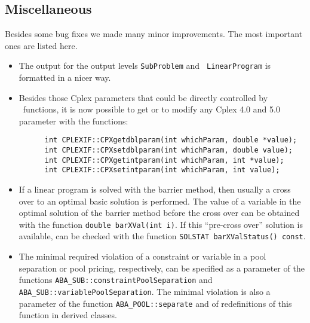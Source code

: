 \subsection{Miscellaneous}

Besides some bug fixes we made many minor improvements. The most important
ones are listed here.

\begin{itemize}
\item The output for the output levels {\tt SubProblem} and {\tt
 LinearProgram} is formatted in a nicer way.
\item Besides those Cplex parameters that could be directly controlled
      by \ABACUS\ functions, it is now possible to get or to modify
      any Cplex 4.0 and 5.0 parameter with the functions:
      \begin{verbatim}
      int CPLEXIF::CPXgetdblparam(int whichParam, double *value);
      int CPLEXIF::CPXsetdblparam(int whichParam, double value);
      int CPLEXIF::CPXgetintparam(int whichParam, int *value);
      int CPLEXIF::CPXsetintparam(int whichParam, int value);
      \end{verbatim}
\item If a linear program is solved with the barrier method, then
      usually a cross over to an optimal basic solution is
      performed. The value of a variable in the
      optimal solution of the barrier method before 
      the cross over can be obtained with the function
      {\tt double barXVal(int i)}. If this ``pre-cross over'' solution
      is available, can be checked with the function
      {\tt SOLSTAT barXValStatus() const}.

\item The minimal required violation of a constraint or variable
      in a pool separation or pool pricing, respectively, can be
      specified as a parameter of the functions
      {\tt ABA\_SUB::constraintPoolSeparation} and 
      {\tt ABA\_SUB::variablePoolSeparation}. The minimal violation
      is also a parameter of the function  {\tt ABA\_POOL::separate}
      and of redefinitions of this function in derived classes.
\end{itemize}
